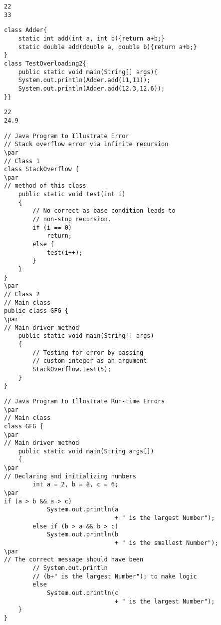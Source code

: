 \documentclass{book}
\def\lthtmlcheckvsize{\ifdim\ht\sizebox<\vsize 
  \ifdim\wd\sizebox<\hsize\expandafter\hfill\fi \expandafter\vfill
  \else\expandafter\vss\fi}%
\begin{document}
{\newpage\clearpage
{}%
\begin{lstlisting}
22
33
\end{lstlisting}%
\lthtmlfigureZ
\lthtmlcheckvsize\clearpage}

{\newpage\clearpage
{}%
\begin{lstlisting}
class Adder{  
	static int add(int a, int b){return a+b;}  
	static double add(double a, double b){return a+b;}  
}  
class TestOverloading2{  
	public static void main(String[] args){  
	System.out.println(Adder.add(11,11));  
	System.out.println(Adder.add(12.3,12.6));  
}}  
\end{lstlisting}%
\lthtmlfigureZ
\lthtmlcheckvsize\clearpage}

{\newpage\clearpage
{}%
\begin{lstlisting}
22
24.9
\end{lstlisting}%
\lthtmlfigureZ
\lthtmlcheckvsize\clearpage}

{\newpage\clearpage
{}%
\begin{lstlisting}
// Java Program to Illustrate Error
// Stack overflow error via infinite recursion
\par
// Class 1
class StackOverflow {
\par
// method of this class
    public static void test(int i)
    {
        // No correct as base condition leads to
        // non-stop recursion.
        if (i == 0)
            return;
        else {
            test(i++);
        }
    }
}
\par
// Class 2
// Main class
public class GFG {
\par
// Main driver method
    public static void main(String[] args)
    {
        // Testing for error by passing
        // custom integer as an argument
        StackOverflow.test(5);
    }
}
\end{lstlisting}%
\lthtmlfigureZ
\lthtmlcheckvsize\clearpage}

{\newpage\clearpage
{}%
\begin{lstlisting}
// Java Program to Illustrate Run-time Errors
\par
// Main class
class GFG {
\par
// Main driver method
    public static void main(String args[])
    {
\par
// Declaring and initializing numbers
        int a = 2, b = 8, c = 6;
\par
if (a > b && a > c)
            System.out.println(a
                               + " is the largest Number");
        else if (b > a && b > c)
            System.out.println(b
                               + " is the smallest Number");
\par
// The correct message should have been
        // System.out.println
        // (b+" is the largest Number"); to make logic
        else
            System.out.println(c
                               + " is the largest Number");
    }
}
\end{lstlisting}%
\lthtmlfigureZ
\lthtmlcheckvsize\clearpage}
\end{document}
